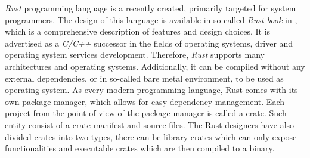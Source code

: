 \textit{Rust} programming language is a recently created, primarily targeted for system programmers. The design of this language is available in so-called \textit{Rust book} in \cite{rustbook}, which is a comprehensive description of features and design choices.  It is advertised as a \textit{C/C++} successor in the fields of operating systems, driver and operating system services development. Therefore, \textit{Rust} supports many architectures and operating systems. Additionally, it can be compiled without any external dependencies, or in so-called bare metal environment, to be used as operating system. As every modern programming language, Rust comes with its own package manager, which allows for easy dependency management. Each project from the point of view of the package manager is called a crate. Such entity consist of a crate manifest and source files. The Rust designers have also divided crates into two types, there can be library crates which can only expose functionalities and executable crates which are then compiled to a binary.

